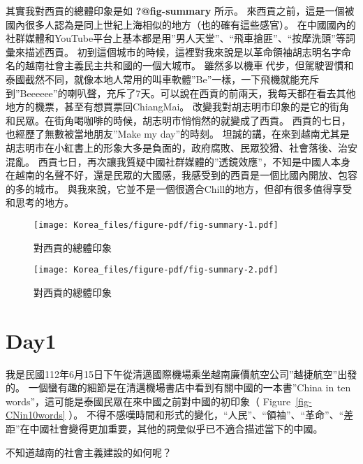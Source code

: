 \documentclass[
  a4paper,
]{ctexart}
\begin{document}
其實我對西貢的總體印象是如 \textbf{?@fig-summary} 所示。
來西貢之前，這是一個被國內很多人認為是同上世紀上海相似的地方（也的確有這些感官）。
在中國國內的社群媒體和YouTube平台上基本都是用''男人天堂''、``飛車搶匪''、``按摩洗頭''等詞彙來描述西貢。
初到這個城市的時候，這裡對我來說是以革命領袖胡志明名字命名的越南社會主義民主共和國的一個大城市。
雖然多以機車🛵代步，但駕駛習慣和泰國截然不同，就像本地人常用的叫車軟體''Be''一樣，一下飛機就能充斥到''Beeeeee''的喇叭聲，充斥了7天。可以說在西貢的前兩天，我每天都在看去其他地方的機票，甚至有想買票回ChiangMai。
改變我對胡志明市印象的是它的街角和民眾。在街角喝咖啡的時候，胡志明市悄悄然的就變成了西貢。
西貢的七日，也經歷了無數被當地朋友''Make my day''的時刻。
坦誠的講，在來到越南尤其是胡志明市在小紅書上的形象大多是負面的，政府腐敗、民眾狡猾、社會落後、治安混亂。
西貢七日，再次讓我質疑中國社群媒體的''透鏡效應''，不知是中國人本身在越南的名聲不好，還是民眾的大國感，我感受到的西貢是一個比國內開放、包容的多的城市。
與我來說，它並不是一個很適合Chill的地方，但卻有很多值得享受和思考的地方。

\begin{figure}

{\centering \texttt{[image: Korea\_files/figure-pdf/fig-summary-1.pdf]}

}

\caption{\label{fig-summary-1}對西貢的總體印象}

\end{figure}

\begin{figure}

{\centering \texttt{[image: Korea\_files/figure-pdf/fig-summary-2.pdf]}

}

\caption{\label{fig-summary-2}對西貢的總體印象}

\end{figure}

\hypertarget{day1-2}{%
\section{Day1}\label{day1-2}}

我是民國112年6月15日下午從清邁國際機場乘坐越南廉價航空公司''越捷航空''出發的。
一個蠻有趣的細節是在清邁機場書店中看到有關中國的一本書''China in ten
words''，這可能是泰國民眾在來中國之前對中國的初印象（
Figure~\ref{fig-CNin10words} ）。
不得不感嘆時間和形式的變化，``人民''、``領袖''、``革命''、``差距''在中國社會變得更加重要，其他的詞彙似乎已不適合描述當下的中國。

不知道越南的社會主義建設的如何呢？
\end{document}
